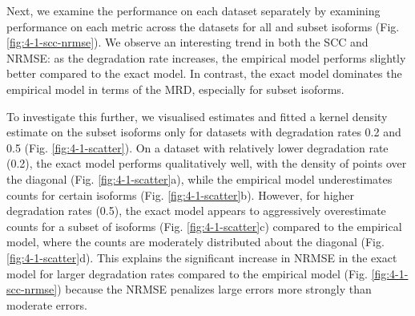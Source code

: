 \begin{table}[htbp]
\centering
\caption[Summary of metrics across simulated datasets for model variations]{Summary of metrics across simulated datasets for model variations. We report the mean SCC, NRMSE and MRD across the five datasets for all isoforms and subset isoforms separately. Bold values indicate the best performance for each column.}
\label{tab:summary-1}
\end{table}%

Next, we examine the performance on each dataset separately by examining performance on each metric across the datasets for all and subset isoforms (Fig. \ref{fig:4-1-scc-nrmse}). We observe an interesting trend in both the SCC and NRMSE: as the degradation rate increases, the empirical model performs slightly better compared to the exact model. In contrast, the exact model dominates the empirical model in terms of the MRD, especially for subset isoforms.  

To investigate this further, we visualised estimates and fitted a kernel density estimate on the subset isoforms only for datasets with degradation rates 0.2 and 0.5 (Fig. \ref{fig:4-1-scatter}). On a dataset with relatively lower degradation rate (0.2), the exact model performs qualitatively well, with the density of points over the diagonal (Fig. \ref{fig:4-1-scatter}a), while the empirical model underestimates counts for certain isoforms (Fig. \ref{fig:4-1-scatter}b). However, for higher degradation rates (0.5), the exact model appears to aggressively overestimate counts for a subset of isoforms (Fig. \ref{fig:4-1-scatter}c) compared to the empirical model, where the counts are moderately distributed about the diagonal (Fig. \ref{fig:4-1-scatter}d). This explains the significant increase in NRMSE in the exact model for larger degradation rates compared to the empirical model (Fig. \ref{fig:4-1-scc-nrmse}) because the NRMSE penalizes large errors more strongly than moderate errors. 

